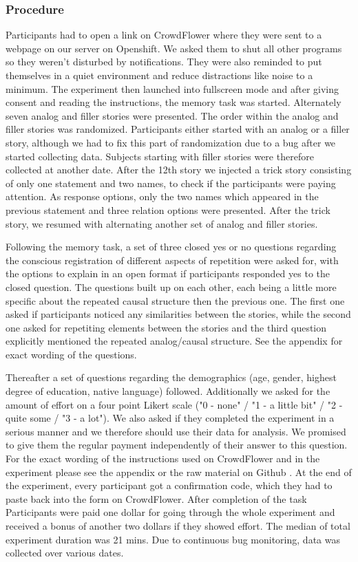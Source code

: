 \documentclass[a4paper,man,natbib,floatsintext,import]{apa6}
\begin{document}
\subsubsection{Procedure}
Participants had to open a link on CrowdFlower where they were sent to a webpage on our server on Openshift. We asked them to shut all other programs so they weren't disturbed by notifications. They were also reminded to put themselves in a quiet environment and reduce distractions like noise to a minimum. The experiment then launched into fullscreen mode and after giving consent and reading the instructions, the memory task was started. Alternately seven analog and filler stories were presented. The order within the analog and filler stories was randomized. Participants either started with an analog or a filler story, although we had to fix this part of randomization due to a bug after we started collecting data. Subjects starting with filler stories were therefore collected at another date. After the 12th story we injected a trick story consisting of only one statement and two names, to check if the participants were paying attention. As response options, only the two names which appeared in the previous statement and three relation options were presented. After the trick story, we resumed with alternating another set of analog and filler stories.

Following the memory task, a set of three closed yes or no questions regarding the conscious registration of different aspects of repetition were asked for, with the options to explain in an open format if participants responded yes to the closed question. The questions built up on each other, each being a little more specific about the repeated causal structure then the previous one. The first one asked if participants noticed any similarities between the stories, while the second one asked for repetiting elements between the stories and the third question explicitly mentioned the repeated analog/causal structure. See the appendix for exact wording of the questions.

Thereafter a set of questions regarding the demographics (age, gender, highest degree of education, native language) followed. Additionally we asked for the amount of effort on a four point Likert scale ("0 - none" / "1 - a little bit" / "2 - quite some / "3 - a lot"). We also asked if they completed the experiment in a serious manner and we therefore should use their data for analysis. We promised to give them the regular payment independently of their answer to this question. For the exact wording of the instructions used on CrowdFlower and in the experiment please see the appendix or the raw material on Github \citep{Oesch2016}. At the end of the experiment, every participant got a confirmation code, which they had to paste back into the form on CrowdFlower. After completion of the task Participants were paid one dollar for going through the whole experiment and received a bonus of another two dollars if they showed effort. The median of total experiment duration was 21 mins.
Due to continuous bug monitoring, data was collected over various dates.
\end{document}
